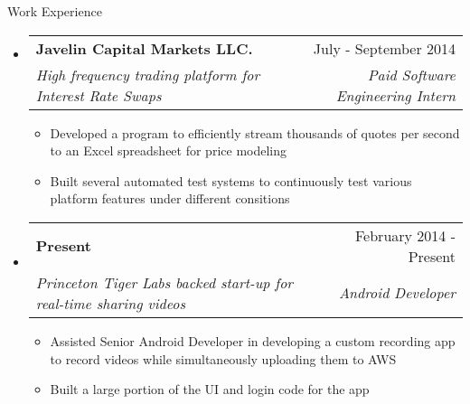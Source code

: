 \documentclass[letterpaper,11pt]{article}
\makeatletter
\newcommand{\resitem}[1]{\item #1 \vspace{-2pt}}
\newcommand{\resheading}[1]{{\large \parashade[.9]{sharpcorners}{\textbf{#1 \vphantom{p\^{E}}}}}}
\newcommand{\ressubheading}[4]{
\begin{tabular*}{6.5in}{l@{\extracolsep{\fill}}r}
		\textbf{#1} & #2 \\
		\textit{#3} & \textit{#4} \\
\end{tabular*}\vspace{-6pt}}
\makeatother
\begin{document}
\begin{description} \item[Work Experience]  \end{description}
\begin{itemize}
\item
	\ressubheading{Javelin Capital Markets LLC.}{July - 				September 2014}
	{High frequency trading platform for Interest Rate Swaps}
	{Paid Software Engineering Intern}
	\begin{itemize}
		\resitem{Developed a program to efficiently stream 					thousands of quotes per second to an Excel 						spreadsheet for price modeling}
		\resitem{Built several automated test systems to 						continuously test various platform features under 				different consitions}
	\end{itemize}
\end{itemize}
\begin{itemize}
\item
	\ressubheading{Present}{February 2014 - Present}
		{Princeton Tiger Labs backed start-up for real-time 				sharing videos} {Android Developer}
		\begin {itemize}
		\resitem{Assisted Senior Android Developer in 						developing a custom recording app to record videos 				while simultaneously uploading them to AWS}
		\resitem{Built a large portion of the UI and login code 			for the app}
		\end{itemize}
\end{itemize}
\end{document}
